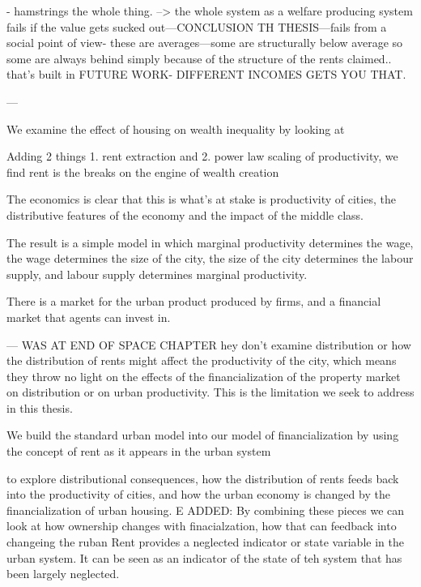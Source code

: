 

- hamstrings the whole thing.
--> the whole system as a welfare producing system fails if the value gets sucked out---CONCLUSION TH THESIS---fails from a social point of view-
these are averages---some are structurally below average so some are always behind simply because of the structure of the rents claimed.. that's built in FUTURE WORK- DIFFERENT INCOMES GETS YOU THAT. 


---


We examine the effect of housing on wealth inequality by looking at 

Adding 2 things 1. rent extraction and 2. power law scaling of productivity, we find rent is the breaks on the engine of wealth creation

The economics is clear that this is what's at stake is productivity of cities, the distributive features of the economy and the impact of the middle class.

The result is a simple model in which marginal productivity determines the wage, the wage determines the size of the city, the size of the city determines the labour supply, and labour supply determines marginal productivity. 

There is a market for the urban product produced by firms, and a financial market that agents can invest in.




---
WAS AT END OF SPACE CHAPTER 
hey don't examine distribution or how the distribution of rents might affect the productivity of the city, which means they throw no light on the effects of the financialization of the property market on distribution or on urban productivity.  This is the limitation we seek to address in this thesis. 

We build the  standard urban model into our model of financialization by using the concept of rent as it appears in the urban system


to explore distributional consequences, how the distribution of rents feeds back into the productivity of cities, and how the urban economy is changed by the financialization of urban housing. %
E ADDED: By combining these pieces we can look at how ownership changes with finacialzation, how that can feedback into changeing the ruban
Rent provides a  neglected indicator or state variable in the urban system. It can be  seen as an indicator of the state of teh system that has been largely neglected.
